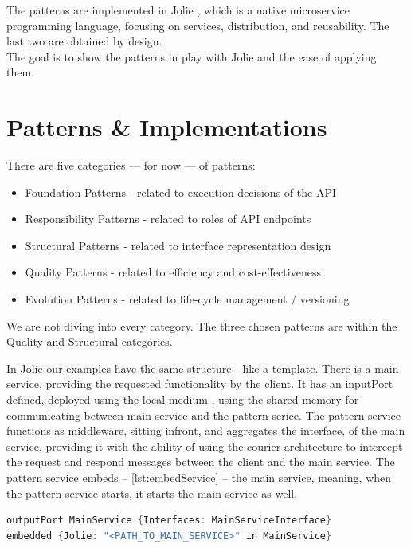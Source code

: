 \documentclass[12pt]{article}
\begin{document}
The patterns are implemented in Jolie \cite{JolieAboutPage}, which is a native microservice programming language, focusing on services, distribution, and reusability. The last two are obtained by design. \\
The goal is to show the patterns in play with Jolie and the ease of applying them. 

\newpage

\section{Patterns \& Implementations}

There are five categories --- for now --- of  patterns: 

\begin{itemize}
    \item Foundation Patterns - related to execution decisions of the API
    \item Responsibility Patterns - related to roles of API endpoints
    \item Structural Patterns - related to interface representation design
    \item Quality Patterns - related to efficiency and cost-effectiveness
    \item Evolution Patterns - related to life-cycle management / versioning
\end{itemize}

We are not diving into every category. The three chosen patterns are within the Quality and Structural categories. 

In Jolie our examples have the same structure - like a template. There is a main service, providing the requested functionality by the client. It has an inputPort defined, deployed using the local medium \cite{LocalLoc}, using the shared memory for communicating between main service and the pattern serice. The pattern service functions as middleware, sitting infront, and aggregates the interface, of the main service, providing it with the ability of using the courier \cite{Courier} architecture to intercept the request and respond messages between the client and the main service. The pattern service embeds -- \ref{lst:embedService} -- the main service, meaning, when the pattern service starts, it starts the main service as well. 

\begin{lstlisting}[caption=Embed main service into the pattern service, 
    captionpos=b, language=java, label=embedService, frame=single]
outputPort MainService {Interfaces: MainServiceInterface}
embedded {Jolie: "<PATH_TO_MAIN_SERVICE>" in MainService}
\end{lstlisting}
\end{document}
